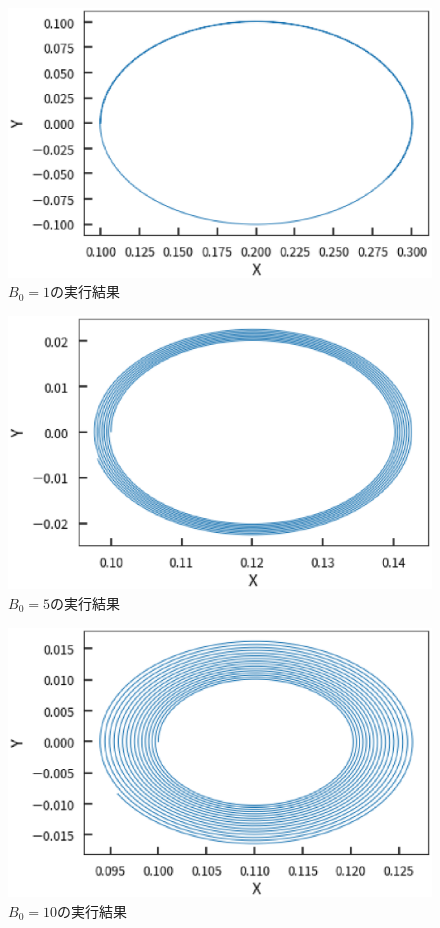 \documentclass[a4j]{jarticle}
\begin{document}
        \begin{figure}[H]
          \centering
          \includegraphics[scale=0.6]{sim9xyB1.eps}
          \caption{$B_0=1$の実行結果}
          \label{B1}
          \end{figure}
          \begin{figure}[H]
            \centering
            \includegraphics[scale=0.6]{sim9xyB5.eps}
            \caption{$B_0=5$の実行結果}
            \label{B5}
            \end{figure}
        \begin{figure}[H]
          \centering
          \includegraphics[scale=0.6]{sim9xyB10.eps}
          \caption{$B_0=10$の実行結果}
          \label{B10}
          \end{figure}
\end{document}
